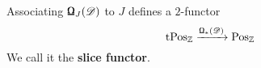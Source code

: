 %
%
%
%
%

\begin{prop}\label{af}
Associating $\textnormal{\Libra}_J(\mathscr{D})$ to $J$ defines a $2$-functor $$\textnormal{tPos}_{\mathbb{Z}} \xrightarrow{\textnormal{\Libra}_*(\mathscr{D})} \textnormal{Pos}_{\mathbb{Z}}$$
We call it the \textbf{slice functor}. 
\end{prop} 

